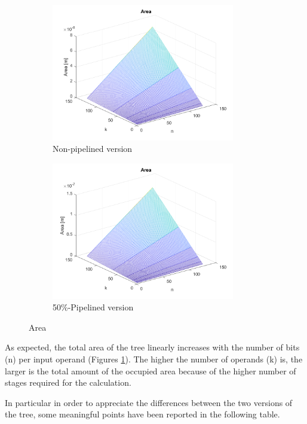 \begin{figure}[H]
{}{
		\begin{subfigure}{0.55\textwidth}
			\includegraphics[width=8cm]{immagini/radix2ppipe0/area3D.png}
			\caption{Non-pipelined version}
		\end{subfigure}
		\begin{subfigure}{0.55\textwidth}
			\includegraphics[width=8cm]{immagini/radix2ppipe2/area3D.png}
			\caption{50\%-Pipelined version}
		\end{subfigure}
	}
	\caption{Area}
	\label{fig:Area}
\end{figure}
As expected, the total area of the tree linearly increases with the number of bits (n) per input operand (Figures \ref{fig:Area}). The higher the number of operands (k) is, the larger is the total amount of the occupied area because of the higher number of stages required for the calculation.

In particular in order to appreciate the differences between the two versions of the tree, some meaningful points have been reported in the following table.


